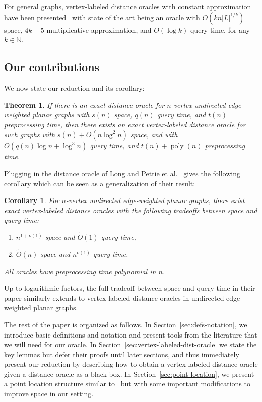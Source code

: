 \documentclass[a4paper,UKenglish,cleveref, autoref, thm-restate]{article}
\newtheorem{theorem}{Theorem}
\newtheorem{corollary}{Corollary}
\def\poly{\operatorname{poly}}
\begin{document}
For general graphs, vertex-labeled distance oracles with constant approximation have been presented~\cite{Hermelin2011,Chechik2012,Gutenberg2018} with state of the art being an oracle with $O(kn|L|^{1/k})$ space, $4k-5$ multiplicative approximation, and $O(\log k)$ query time, for any $k\in\mathbb N$.

\subsection{Our contributions}
We now state our reduction and its corollary:
\begin{theorem}
If there is an exact distance oracle for $n$-vertex undirected edge-weighted planar graphs with $s(n)$ space, $q(n)$ query time, and $t(n)$ preprocessing time, then there exists an exact vertex-labeled distance oracle for such graphs with $s(n) + O(n\log^2 n)$ space, and with $O(q(n)\log n + \log^3 n)$ query time, and $t(n) + \poly(n)$ preprocessing time.
\end{theorem}
Plugging in the distance oracle of Long and Pettie et al.~\cite{Long2021} gives the following corollary which can be seen as a generalization of their result:
\begin{corollary}
For $n$-vertex undirected edge-weighted planar graphs, there exist exact vertex-labeled distance oracles with the following tradeoffs between space and query time:
\begin{enumerate}
    \item $n^{1+o(1)}$ space and $\tilde O(1)$ query time,
    \item $\tilde O(n)$ space and $n^{o(1)}$ query time.
\end{enumerate}
All oracles have preprocessing time polynomial in $n$.
\end{corollary}
Up to logarithmic factors, the full tradeoff between space and query time in their paper similarly extends to vertex-labeled distance oracles in undirected edge-weighted planar graphs.

The rest of the paper is organized as follows. In Section~\ref{sec:defs-notation}, we introduce basic definitions and notation and present tools from the literature that we will need for our oracle. In Section~\ref{sec:vertex-labeled-dist-oracle} we state the key lemmas but defer their proofs until later sections, and thus immediately present our reduction by describing how to obtain a vertex-labeled distance oracle given a distance oracle as a black box. In Section~\ref{sec:point-location}, we present a point location structure similar to~\cite{Gawrychowski2018} but with some important modifications to improve space in our setting.
\end{document}
